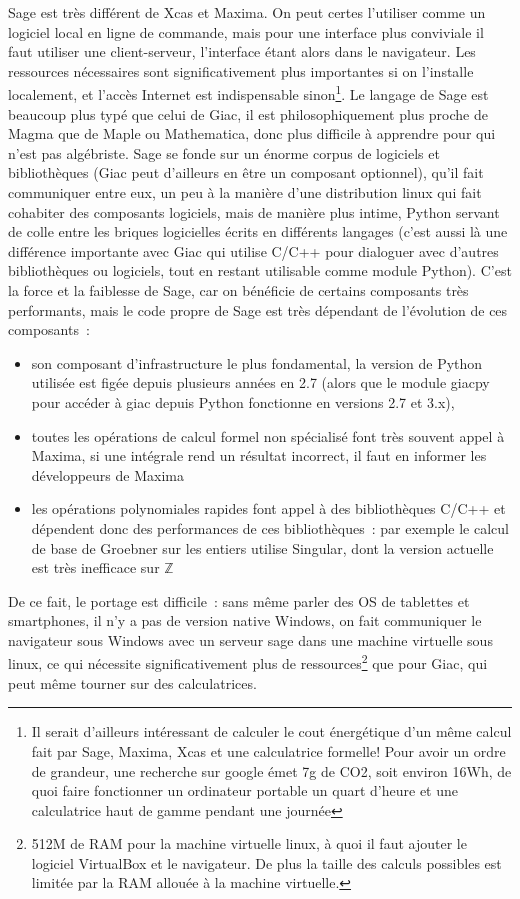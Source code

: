 \documentclass[a4paper,11pt]{article}
\newcommand{\Z}{{\mathbb{Z}}}
\begin{document}
Sage est tr\`es diff\'erent de Xcas et Maxima. On peut certes l'utiliser
comme un logiciel local en ligne de commande, mais
pour une interface plus conviviale il faut utiliser une 
client-serveur, l'interface \'etant alors dans le navigateur. Les
ressources n\'ecessaires sont significativement plus importantes
si on l'installe localement, et l'acc\`es Internet est indispensable
sinon\footnote{Il serait d'ailleurs int\'eressant de calculer le 
cout \'energ\'etique d'un m\^eme calcul fait par Sage, Maxima, 
Xcas et une calculatrice formelle! Pour avoir un ordre
de grandeur, une recherche sur google \'emet 7g de CO2, 
soit environ 16Wh, de quoi faire fonctionner un ordinateur 
portable un quart d'heure et une calculatrice haut de gamme
pendant une journ\'ee}. Le langage de 
Sage est beaucoup plus typ\'e que celui de Giac, il est
philosophiquement
plus proche de Magma que de Maple ou Mathematica,
donc plus difficile \`a apprendre pour qui n'est pas alg\'ebriste.
Sage se fonde sur un \'enorme corpus de logiciels et
biblioth\`eques (Giac peut d'ailleurs en \^etre un composant
optionnel), qu'il fait communiquer entre eux, un peu \`a la
mani\`ere d'une distribution linux qui fait cohabiter des composants
logiciels, mais de mani\`ere plus intime, Python servant
de colle entre les briques logicielles \'ecrits en diff\'erents
langages (c'est aussi l\`a une diff\'erence importante avec Giac
qui utilise C/C++ pour dialoguer avec d'autres biblioth\`eques
ou logiciels, tout en restant utilisable comme module
Python). C'est la force et la
faiblesse de Sage, car on b\'en\'eficie de certains composants tr\`es
performants, mais le code propre de Sage est tr\`es d\'ependant
de l'\'evolution de ces composants~:
\begin{itemize}
\item son composant d'infrastructure le plus fondamental, 
la version de Python utilis\'ee est
fig\'ee depuis plusieurs ann\'ees en 2.7 (alors que le module
giacpy pour acc\'eder \`a giac depuis Python fonctionne
en versions 2.7 et 3.x),
\item toutes les op\'erations de calcul formel non
sp\'ecialis\'e font tr\`es souvent appel \`a Maxima,
si une int\'egrale rend un r\'esultat incorrect, il faut en informer
les d\'eveloppeurs de Maxima
\item
les op\'erations polynomiales rapides font appel \`a des
biblioth\`eques C/C++ et d\'ependent donc des performances
de ces biblioth\`eques~: par exemple le calcul de base
de Groebner sur les entiers utilise Singular, dont la version
actuelle est tr\`es inefficace sur $\Z$
\end{itemize} 
De ce fait, le portage est difficile~: sans m\^eme parler des OS de tablettes
et smartphones, il n'y a pas de version native Windows,
on fait communiquer le navigateur sous Windows avec un serveur
sage dans une machine virtuelle sous linux, ce qui n\'ecessite
significativement plus de ressources\footnote{512M de RAM pour la
machine virtuelle linux, \`a quoi il faut ajouter 
le logiciel VirtualBox et le navigateur. De plus la taille des
calculs possibles est limit\'ee par la RAM allou\'ee \`a
la machine virtuelle.} que pour Giac, 
qui peut m\^eme tourner sur des calculatrices.
\end{document}
